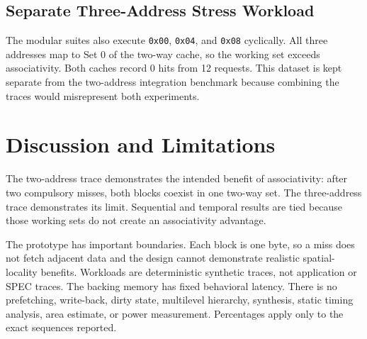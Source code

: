 \documentclass[10pt,twocolumn]{article}
\begin{document}
\subsection{Separate Three-Address Stress Workload}
The modular suites also execute \texttt{0x00}, \texttt{0x04}, and \texttt{0x08} cyclically. All three addresses map to Set 0 of the two-way cache, so the working set exceeds associativity. Both caches record 0 hits from 12 requests. This dataset is kept separate from the two-address integration benchmark because combining the traces would misrepresent both experiments.

\section{Discussion and Limitations}
The two-address trace demonstrates the intended benefit of associativity: after two compulsory misses, both blocks coexist in one two-way set. The three-address trace demonstrates its limit. Sequential and temporal results are tied because those working sets do not create an associativity advantage.

The prototype has important boundaries. Each block is one byte, so a miss does not fetch adjacent data and the design cannot demonstrate realistic spatial-locality benefits. Workloads are deterministic synthetic traces, not application or SPEC traces. The backing memory has fixed behavioral latency. There is no prefetching, write-back, dirty state, multilevel hierarchy, synthesis, static timing analysis, area estimate, or power measurement. Percentages apply only to the exact sequences reported.
\end{document}
